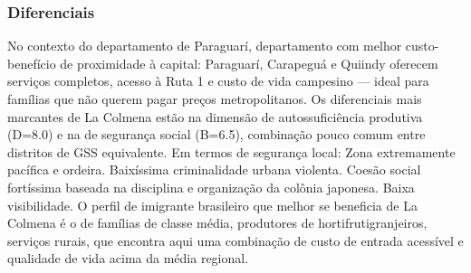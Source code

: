 \subsubsection*{Diferenciais}\label{dif-la-colmena-0907}
No contexto do departamento de Paraguarí, departamento com melhor custo-benefício de proximidade à capital: Paraguarí, Carapeguá e Quiindy oferecem serviços completos, acesso à Ruta 1 e custo de vida campesino — ideal para famílias que não querem pagar preços metropolitanos. Os diferenciais mais marcantes de La Colmena estão na dimensão de autossuficiência produtiva (D=8.0) e na de segurança social (B=6.5), combinação pouco comum entre distritos de GSS equivalente. Em termos de segurança local: Zona extremamente pacífica e ordeira. Baixíssima criminalidade urbana violenta. Coesão social fortíssima baseada na disciplina e organização da colônia japonesa. Baixa visibilidade. O perfil de imigrante brasileiro que melhor se beneficia de La Colmena é o de famílias de classe média, produtores de hortifrutigranjeiros, serviços rurais, que encontra aqui uma combinação de custo de entrada acessível e qualidade de vida acima da média regional.
